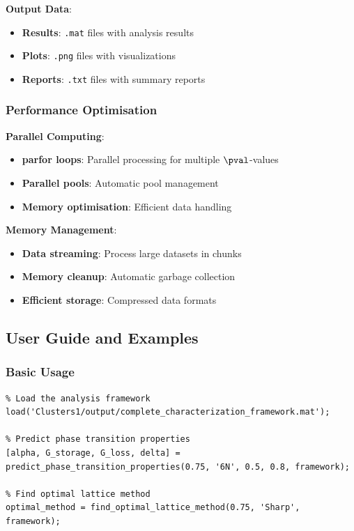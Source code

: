 \textbf{Output Data}:
\begin{itemize}
    \item \textbf{Results}: \texttt{.mat} files with analysis results
    \item \textbf{Plots}: \texttt{.png} files with visualizations
    \item \textbf{Reports}: \texttt{.txt} files with summary reports
\end{itemize}

\subsubsection{Performance Optimisation}
\textbf{Parallel Computing}:
\begin{itemize}
    \item \textbf{parfor loops}: Parallel processing for multiple $\pval$-values
    \item \textbf{Parallel pools}: Automatic pool management
    \item \textbf{Memory optimisation}: Efficient data handling
\end{itemize}

\textbf{Memory Management}:
\begin{itemize}
    \item \textbf{Data streaming}: Process large datasets in chunks
    \item \textbf{Memory cleanup}: Automatic garbage collection
    \item \textbf{Efficient storage}: Compressed data formats
\end{itemize}

\subsection{User Guide and Examples}

\subsubsection{Basic Usage}
\begin{verbatim}
% Load the analysis framework
load('Clusters1/output/complete_characterization_framework.mat');

% Predict phase transition properties
[alpha, G_storage, G_loss, delta] = predict_phase_transition_properties(0.75, '6N', 0.5, 0.8, framework);

% Find optimal lattice method
optimal_method = find_optimal_lattice_method(0.75, 'Sharp', framework);
\end{verbatim}

